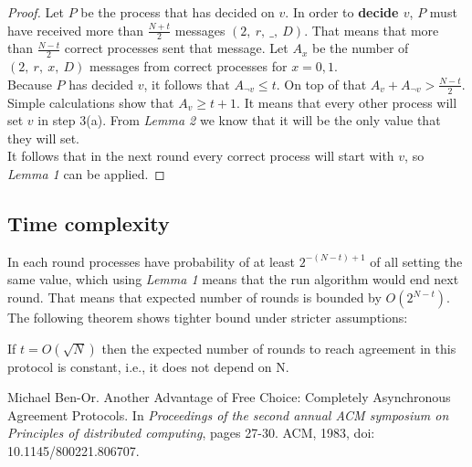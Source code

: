\documentclass[12pt, a4paper]{article}
\begin{document}
\begin{proof}
Let $P$ be the process that has decided on $v$.
In order to \textbf{decide $v$}, $P$ must have received more than $\frac{N+t}{2}$ messages $(2,\ r,\ \_,\ D)$. That means that more than $\frac{N-t}{2}$ correct processes sent that message. Let $A_x$ be the number of $(2,\ r,\ x,\ D)$ messages from correct processes for $x=0,1$.\\
Because $P$ has decided $v$, it follows that $A_{\neg v}\leq t$. On top of that $A_v+A_{\neg v}>\frac{N-t}{2}$.\\
Simple calculations show that $A_v\geq t+1$. It means that every other process will set $v$ in step 3(a). From \textit{Lemma 2} we know that it will be the only value that they will set.\\
It follows that in the next round every correct process will start with $v$, so \textit{Lemma 1} can be applied.
\end{proof}
\subsection*{Time complexity}
In each round processes have probability of at least $2^{-(N-t)+1}$ of all setting the same value, which using \textit{Lemma 1} means that the run algorithm would end next round. That means that expected number of rounds is bounded by $O(2^{N-t})$.\\
The following theorem shows tighter bound under stricter assumptions:
\begin{theorem}\cite{Ben83}
If $t=O(\sqrt{N})$ then the expected number of rounds to reach agreement in this protocol is constant, i.e., it does not depend on N. 
\end{theorem}
\begin{thebibliography}{9}
 Michael Ben-Or. Another Advantage of Free Choice: Completely Asynchronous Agreement Protocols. In \textit{Proceedings of the second annual ACM symposium on Principles of distributed computing}, pages 27-30. ACM, 1983, doi: 10.1145/800221.806707.
\end{thebibliography}
\end{document}
